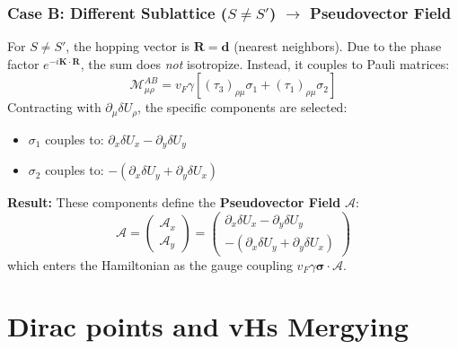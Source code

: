 \documentclass[10pt, oneside]{article}
\begin{document}
\subsubsection{Case B: Different Sublattice ($S \neq S'$) $\rightarrow$ Pseudovector Field}
For $S \neq S'$, the hopping vector is $\boldsymbol{R} = \boldsymbol{d}$ (nearest neighbors). Due to the phase factor $e^{-i\boldsymbol{K}\cdot\boldsymbol{R}}$, the sum does \textit{not} isotropize. Instead, it couples to Pauli matrices:
\begin{equation}
\mathcal{M}_{\mu\rho}^{AB} = v_F \gamma \left[ (\tau_3)_{\rho\mu} \sigma_1 + (\tau_1)_{\rho\mu} \sigma_2 \right]
\end{equation}
Contracting with $\partial_\mu \delta U_\rho$, the specific components are selected:
\begin{itemize}
    \item $\sigma_1$ couples to: $\partial_x \delta U_x - \partial_y \delta U_y$
    \item $\sigma_2$ couples to: $-(\partial_x \delta U_y + \partial_y \delta U_x)$
\end{itemize}
\textbf{Result:} These components define the \textbf{Pseudovector Field} $\mathcal{A}$:
\begin{equation}
\mathcal{A} = \begin{pmatrix} \mathcal{A}_x \\ \mathcal{A}_y \end{pmatrix} = \begin{pmatrix} \partial_x \delta U_x - \partial_y \delta U_y \\ -(\partial_x \delta U_y + \partial_y \delta U_x) \end{pmatrix}
\end{equation}
which enters the Hamiltonian as the gauge coupling $v_F \gamma \boldsymbol{\sigma} \cdot \mathcal{A}$.


\section{Dirac points and vHs Mergying}
\end{document}
